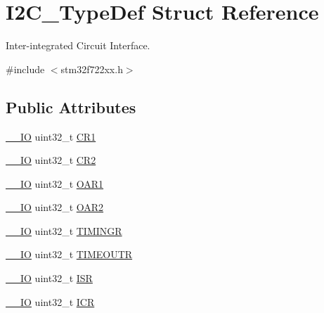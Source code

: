\hypertarget{struct_i2_c___type_def}{}\section{I2\+C\+\_\+\+Type\+Def Struct Reference}
\label{struct_i2_c___type_def}


Inter-\/integrated Circuit Interface.  




{\ttfamily \#include $<$stm32f722xx.\+h$>$}

\subsection*{Public Attributes}
\begin{DoxyCompactItemize}
\item 
\mbox{\hyperlink{core__sc300_8h_aec43007d9998a0a0e01faede4133d6be}{\+\_\+\+\_\+\+IO}} uint32\+\_\+t \mbox{\hyperlink{struct_i2_c___type_def_a91782f7b81475b0e3c3779273abd26aa}{C\+R1}}
\item 
\mbox{\hyperlink{core__sc300_8h_aec43007d9998a0a0e01faede4133d6be}{\+\_\+\+\_\+\+IO}} uint32\+\_\+t \mbox{\hyperlink{struct_i2_c___type_def_a29eb47db03d5ad7e9b399f8895f1768c}{C\+R2}}
\item 
\mbox{\hyperlink{core__sc300_8h_aec43007d9998a0a0e01faede4133d6be}{\+\_\+\+\_\+\+IO}} uint32\+\_\+t \mbox{\hyperlink{struct_i2_c___type_def_ae8269169fcbdc2ecb580208d99c2f89f}{O\+A\+R1}}
\item 
\mbox{\hyperlink{core__sc300_8h_aec43007d9998a0a0e01faede4133d6be}{\+\_\+\+\_\+\+IO}} uint32\+\_\+t \mbox{\hyperlink{struct_i2_c___type_def_a73988a218be320999c74a641b3d6e3c1}{O\+A\+R2}}
\item 
\mbox{\hyperlink{core__sc300_8h_aec43007d9998a0a0e01faede4133d6be}{\+\_\+\+\_\+\+IO}} uint32\+\_\+t \mbox{\hyperlink{struct_i2_c___type_def_a92514ade6721d7c8e35d95c5b5810852}{T\+I\+M\+I\+N\+GR}}
\item 
\mbox{\hyperlink{core__sc300_8h_aec43007d9998a0a0e01faede4133d6be}{\+\_\+\+\_\+\+IO}} uint32\+\_\+t \mbox{\hyperlink{struct_i2_c___type_def_a95f1607b6254092066a3b6e35146e28a}{T\+I\+M\+E\+O\+U\+TR}}
\item 
\mbox{\hyperlink{core__sc300_8h_aec43007d9998a0a0e01faede4133d6be}{\+\_\+\+\_\+\+IO}} uint32\+\_\+t \mbox{\hyperlink{struct_i2_c___type_def_a0f73f2b049d95841c54313f0cc949afe}{I\+SR}}
\item 
\mbox{\hyperlink{core__sc300_8h_aec43007d9998a0a0e01faede4133d6be}{\+\_\+\+\_\+\+IO}} uint32\+\_\+t \mbox{\hyperlink{struct_i2_c___type_def_a790a1957ec69244915a9637f7d925cf7}{I\+CR}}

\end{DoxyCompactItemize}
